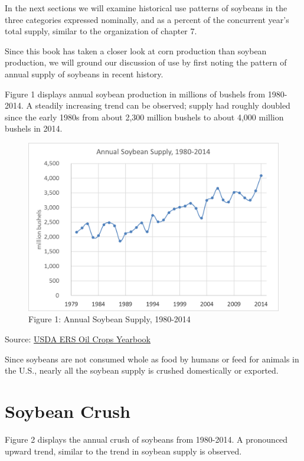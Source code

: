 \documentclass[]{book}
\theoremstyle{definition}
\theoremstyle{definition}
\theoremstyle{remark}
\begin{document}
In the next sections we will examine historical use patterns of soybeans
in the three categories expressed nominally, and as a percent of the
concurrent year's total supply, similar to the organization of chapter
7.

Since this book has taken a closer look at corn production than soybean
production, we will ground our discussion of use by first noting the
pattern of annual supply of soybeans in recent history.

Figure 1 displays annual soybean production in millions of bushels from
1980-2014. A steadily increasing trend can be observed; supply had
roughly doubled since the early 1980s from about 2,300 million bushels
to about 4,000 million bushels in 2014.

\begin{figure}[htbp]
\centering
\includegraphics{Excel-files/ForecastingUseSoy-OilCropsYearbook_files/image013.png}
\caption{Figure 1: Annual Soybean Supply, 1980-2014}
\end{figure}

Source:
\href{http://www.ers.usda.gov/data-products/oil-crops-yearbook.aspx}{USDA
ERS Oil Crops Yearbook}

Since soybeans are not consumed whole as food by humans or feed for
animals in the U.S., nearly all the soybean supply is crushed
domestically or exported.

\section{Soybean Crush}\label{soybean-crush}

Figure 2 displays the annual crush of soybeans from 1980-2014. A
pronounced upward trend, similar to the trend in soybean supply is
observed.
\end{document}
